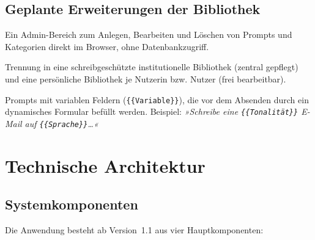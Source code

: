 \documentclass[12pt, a4paper]{article}
\begin{document}
\subsection{Geplante Erweiterungen der Bibliothek}

\begin{description}[leftmargin=1.5cm, style=nextline]
  \item[Verwaltungsoberfläche]
    Ein Admin-Bereich zum Anlegen, Bearbeiten und Löschen von Prompts und Kategorien direkt im Browser, ohne Datenbankzugriff.
  \item[Zweistufiges Bibliotheksmodell]
    Trennung in eine schreibgeschützte institutionelle Bibliothek (zentral gepflegt) und eine persönliche Bibliothek je Nutzerin bzw. Nutzer (frei bearbeitbar).
  \item[Template-Platzhalter]
    Prompts mit variablen Feldern (\texttt{\{\{Variable\}\}}), die vor dem Absenden durch ein dynamisches Formular befüllt werden. Beispiel: \textit{»Schreibe eine \texttt{\{\{Tonalität\}\}} E-Mail auf \texttt{\{\{Sprache\}\}}…«}
\end{description}

\section{Technische Architektur}

\subsection{Systemkomponenten}

Die Anwendung besteht ab Version~1.1 aus vier Hauptkomponenten:
\end{document}
